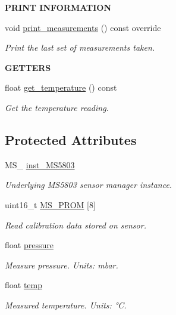 \begin{Indent}{\bf P\+R\+I\+NT I\+N\+F\+O\+R\+M\+A\+T\+I\+ON}\par
\begin{DoxyCompactItemize}
\item 
void \hyperlink{class_loom___m_s5803_a68188af662a98e8324ac267a2d94690a}{print\+\_\+measurements} () const override
\begin{DoxyCompactList}\small\item\em Print the last set of measurements taken. \end{DoxyCompactList}\end{DoxyCompactItemize}
\end{Indent}
\begin{Indent}{\bf G\+E\+T\+T\+E\+RS}\par
\begin{DoxyCompactItemize}
\item 
float \hyperlink{class_loom___m_s5803_a7297d4cd69e9c44bc10bb6f3edbdff00}{get\+\_\+temperature} () const 
\begin{DoxyCompactList}\small\item\em Get the temperature reading. \end{DoxyCompactList}\end{DoxyCompactItemize}
\end{Indent}
\subsection*{Protected Attributes}
\begin{DoxyCompactItemize}
\item 
M\+S\+\_ \hyperlink{class_loom___m_s5803_a51efd19c53ce03744197e05c6c21ec2d}{inst\+\_\+\+M\+S5803}
\begin{DoxyCompactList}\small\item\em Underlying M\+S5803 sensor manager instance. \end{DoxyCompactList}\item 
uint16\+\_\+t \hyperlink{class_loom___m_s5803_aef9ff121171d7b27f369a60495666ab7}{M\+S\+\_\+\+P\+R\+OM} \mbox{[}8\mbox{]}
\begin{DoxyCompactList}\small\item\em Read calibration data stored on sensor. \end{DoxyCompactList}\item 
float \hyperlink{class_loom___m_s5803_afe0623825dcab69c7f204e32b0fcab56}{pressure}
\begin{DoxyCompactList}\small\item\em Measure pressure. Units\+: mbar. \end{DoxyCompactList}\item 
float \hyperlink{class_loom___m_s5803_a12df20babc5ac276523664c7d6607810}{temp}
\begin{DoxyCompactList}\small\item\em Measured temperature. Units\+: °C. \end{DoxyCompactList}\end{DoxyCompactItemize}
